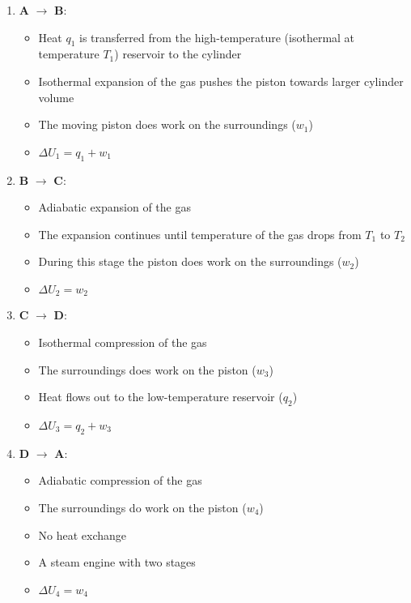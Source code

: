 {\begin{columns}
\begin{column}{9cm}
\begin{enumerate}
\item \tiny\textbf{A} $\rightarrow$ \textbf{B}:
\begin{itemize}
\item \tiny Heat $q_1$ is transferred from the high-temperature (isothermal at temperature $T_1$) reservoir to the cylinder
\item Isothermal expansion of the gas pushes the piston towards larger cylinder volume
\item The moving piston does work on the surroundings ($w_1$)
\item $\Delta U_1 = q_1 + w_1$
\end{itemize}
\item \textbf{B} $\rightarrow$ \textbf{C}:
\begin{itemize}
\item \tiny Adiabatic expansion of the gas
\item The expansion continues until temperature of the gas drops from $T_1$ to $T_2$
\item During this stage the piston does work on the surroundings ($w_2$)
\item $\Delta U_2 = w_2$
\end{itemize}
\item \textbf{C} $\rightarrow$ \textbf{D}:
\begin{itemize}
\item \tiny Isothermal compression of the gas
\item The surroundings does work on the piston ($w_3$)
\item Heat flows out to the low-temperature reservoir ($q_2$)
\item $\Delta U_3 = q_2 + w_3$
\end{itemize}
\item \textbf{D} $\rightarrow$ \textbf{A}:
\begin{itemize}
\item \tiny Adiabatic compression of the gas
\item The surroundings do work on the piston ($w_4$)
\item No heat exchange
\item A steam engine with two stages
\item $\Delta U_4 = w_4$
\end{itemize}

\end{enumerate}

\end{column}

\end{columns}

}

